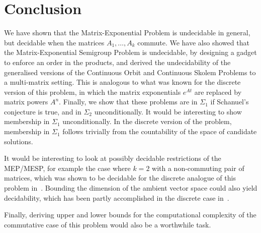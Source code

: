 \section{Conclusion}

We have shown that the Matrix-Exponential Problem is undecidable in general, but decidable when the matrices $A_{1}, \ldots, A_{k}$ commute. We have also showed that the Matrix-Exponential Semigroup Problem is undecidable, by designing a gadget to enforce an order in the products, and derived the undecidability of the generalised versions of the Continuous Orbit and Continuous Skolem Problems to a multi-matrix setting. This is analogous to what was known for the discrete version of this problem, in which the matrix exponentials $e^{At}$ are replaced by matrix powers $A^n$. Finally, we show that these problems are in $\Sigma_{1}$ if Schanuel's conjecture is true, and in $\Sigma_{2}$ unconditionally. It would be interesting to show membership in $\Sigma_{1}$ unconditionally. In the discrete version of the problem, membership in $\Sigma_{1}$ follows trivially from the countability of the space of candidate solutions.

It would be interesting to look at possibly decidable restrictions of the MEP/MESP, for example the case where $k=2$ with a non-commuting pair of matrices, which was shown to be decidable for the discrete analogue of this problem in~\cite{MEHTP}. Bounding the dimension of the ambient vector space could also yield decidability, which has been partly accomplished in the discrete case in~\cite{PS2Z}.

Finally, deriving upper and lower bounds for the computational complexity of the commutative case of this problem would also be a worthwhile task.

